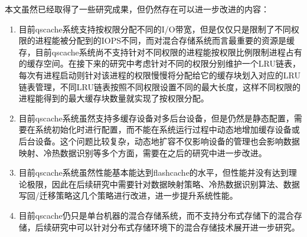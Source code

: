 本文虽然已经取得了一些研究成果，但仍然存在可以进一步改进的内容：

\begin{enumerate}[wide]
    \item 目前qscache系统支持按权限分配不同的I/O带宽，但是仅仅只是限制了不同权限的进程能被分配到的IOPS不同，而对混合存储系统而言最重要的资源是缓存，目前qscache系统尚不支持针对不同权限的进程能按权限比例限制进程占有的缓存空间。在接下来的研究中考虑针对不同的权限分别维护一个LRU链表，每次有进程启动则针对该进程的权限慢慢将分配给它的缓存块划入对应的LRU链表管理，不同LRU链表按照不同权限设置不同的最大长度，这样不同权限的进程能得到的最大缓存块数量就实现了按权限分配。
    \item 目前qscache系统虽然支持多缓存设备对多后台设备，但是仍然是静态配置，需要在系统初始化时进行配置，而不能在系统运行过程中动态地增加缓存设备或后台设备。这个问题比较复杂，动态地扩容不仅影响设备的管理也会影响数据映射、冷热数据识别等多个方面，需要在之后的研究中进一步改进。
    \item 目前qscache系统虽然性能基本能达到flashcache的水平，但性能并没有达到理论极限，因此在后续研究中需要针对数据映射策略、冷热数据识别算法、数据写回/迁移策略这几个策略进行改进，进一步提升系统性能。
    \item 目前qscache仍只是单台机器的混合存储系统，而不支持分布式存储下的混合存储，后续研究中可以针对分布式存储环境下的混合存储技术展开进一步研究。
\end{enumerate}

